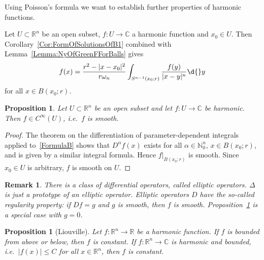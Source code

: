 \documentclass[12pt, oneside, a4paper]{article}
\newtheorem{prop}[thm]{Proposition}
\theoremstyle{dfn}
\newtheorem{rem}[thm]{Remark}
\def\Nbb{\mathbb{N}}
\def\Rbb{\ensuremath{\mathbb{R}}}
\newcommand{\Com}{\mathbb{C}}
\providecommand{\abs}[1]{\lvert#1\rvert}
\begin{document}
Using Poisson's formula we want to establish further properties of harmonic functions.

Let $U \subset \Rbb^n$ be an open subset, $f \colon U \to \Com$ a harmonic function and $x_0 \in U$. Then Corollary~\ref{Cor:FormOfSolutionsOfB1} combined with Lemma~\ref{Lemma:NyOfGreenFForBalls} gives
\begin{equation}\label{FormulaB}
f(x) = \frac{r^2 - \abs{x-x_0}^2}{r \omega_n}
\int_{S^{n-1}(x_0;r)} \frac{f(y)}{\abs{x-y}^n} \d{}y %
\end{equation}
for all $x \in B(x_0;r)$.

\begin{prop}\label{Prop:HarmFctsAreSmooth}
Let $U \subset \Rbb^n$ be an open subset and let $f \colon U \to \Com$ be harmonic. Then $f \in C^\infty(U)$, i.e.\ $f$ is smooth.
\end{prop}

\begin{proof}
The theorem on the differentiation of parameter-dependent integrals applied to~\eqref{FormulaB} shows that $D^\alpha f(x)$ exists for all $\alpha \in \Nbb^n_0$, $x \in B(x_0;r)$, and is given by a similar integral formula. Hence $f|_{B(x_0;r)}$ is smooth. Since $x_0 \in U$ is arbitrary, $f$ is smooth on $U$.
\end{proof}

\begin{rem}
There is a class of differential operators, called elliptic operators. $\Delta$ is just a prototype of an elliptic operator. Elliptic operators $D$ have the so-called regularity property: if $Df = g$ and $g$ is smooth, then $f$ is smooth. Proposition~\ref{Prop:HarmFctsAreSmooth} is a special case with $g = 0$.
\end{rem}

\begin{prop}[Liouville]
Let $f \colon \Rbb^n \to \Rbb$ be a harmonic function. If $f$ is bounded from above or below, then $f$ is constant. If $f \colon \Rbb^n \to \Com$ is harmonic and bounded, i.e.\ $\abs{f(x)} \leqslant C$ for all $x \in \Rbb^n$, then $f$ is constant.
\end{prop}
\end{document}
